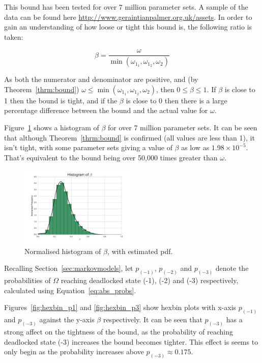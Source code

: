 \documentclass{article}
\numberwithin{equation}{section}
\begin{document}
This bound has been tested for over 7 million parameter sets. A sample of the data can be found here \url{http://www.geraintianpalmer.org.uk/assets}.
In order to gain an understanding of how loose or tight this bound is, the following ratio is taken:

\begin{equation}
\beta = \frac{\omega}{\min(\omega_{1_1}, \omega_{1_2}, \omega_2)}
\end{equation}

As both the numerator and denominator are positive, and (by Theorem~\ref{thrm:bound}) $\omega \leq \min(\omega_{1_1}, \omega_{1_2}, \omega_2)$, then $0 \leq \beta \leq 1$.
If $\beta$ is close to 1 then the bound is tight, and if the $\beta$ is close to 0 then there is a large percentage difference between the bound and the actual value for $\omega$.

Figure~\ref{fig:bound_ratio_hist} shows a histogram of $\beta$ for over 7 million parameter sets.
It can be seen that although Theorem~\ref{thrm:bound} is confirmed (all values are less than 1), it isn't tight, with some parameter sets giving a value of $\beta$ as low as $1.98 \times 10^{-5}$.
That's equivalent to the bound being over 50,000 times greater than $\omega$.

\begin{figure}[!htbp]
  \begin{center}
  \includegraphics[width=0.5\textwidth]{images/ratio_actual_bound}
  \end{center}
  \caption{Normalised histogram of $\beta$, with estimated pdf.}
  \label{fig:bound_ratio_hist}
\end{figure}

Recalling Section~\ref{sec:markovmodels}, let $p_{(-1)}$, $p_{(-2)}$ and $p_{(-3)}$ denote the probabilities of $\Omega$ reaching deadlocked state (-1), (-2) and (-3) respectively, calculated using Equation~\ref{eq:abs_probs}.

Figures~\ref{fig:hexbin_p1} and \ref{fig:hexbin_p3} show hexbin plots with x-axis $p_{(-1)}$ and $p_{(-3)}$ against the y-axis $\beta$ respectively.
It can be seen that $p_{(-3)}$ has a strong affect on the tightness of the bound, as the probability of reaching deadlocked state (-3) increases the bound becomes tighter.
This effect is seems to only begin as the probability increases above $p_{(-3)} \approx 0.175$.
\end{document}
